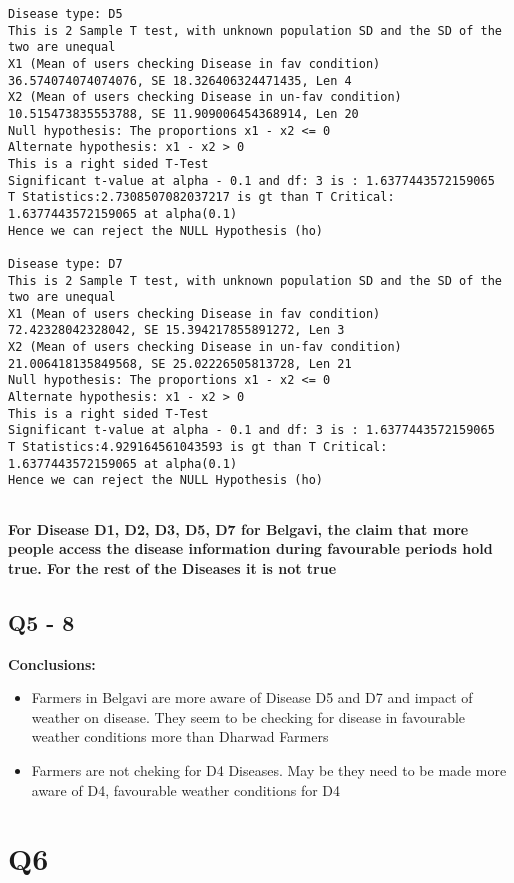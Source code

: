\documentclass[11pt]{article}
\providecommand{\tightlist}{%
      \setlength{\itemsep}{0pt}\setlength{\parskip}{0pt}}
\begin{document}
\begin{Verbatim}[commandchars=\\\{\}]
Disease type: D5
This is 2 Sample T test, with unknown population SD and the SD of the two are unequal
X1 (Mean of users checking Disease in fav condition) 36.574074074074076, SE 18.326406324471435, Len 4
X2 (Mean of users checking Disease in un-fav condition) 10.515473835553788, SE 11.909006454368914, Len 20
Null hypothesis: The proportions x1 - x2 <= 0
Alternate hypothesis: x1 - x2 > 0
This is a right sided T-Test
Significant t-value at alpha - 0.1 and df: 3 is : 1.6377443572159065
T Statistics:2.7308507082037217 is gt than T Critical: 1.6377443572159065 at alpha(0.1)
Hence we can reject the NULL Hypothesis (ho)

Disease type: D7
This is 2 Sample T test, with unknown population SD and the SD of the two are unequal
X1 (Mean of users checking Disease in fav condition) 72.42328042328042, SE 15.394217855891272, Len 3
X2 (Mean of users checking Disease in un-fav condition) 21.006418135849568, SE 25.02226505813728, Len 21
Null hypothesis: The proportions x1 - x2 <= 0
Alternate hypothesis: x1 - x2 > 0
This is a right sided T-Test
Significant t-value at alpha - 0.1 and df: 3 is : 1.6377443572159065
T Statistics:4.929164561043593 is gt than T Critical: 1.6377443572159065 at alpha(0.1)
Hence we can reject the NULL Hypothesis (ho)


    \end{Verbatim}

    \textbf{For Disease D1, D2, D3, D5, D7 for Belgavi, the claim that more
people access the disease information during favourable periods hold
true. For the rest of the Diseases it is not true}

    \subsection{Q5 - 8}\label{q5---8}

    \textbf{Conclusions:}

\begin{itemize}
\tightlist
\item
  Farmers in Belgavi are more aware of Disease D5 and D7 and impact of
  weather on disease. They seem to be checking for disease in favourable
  weather conditions more than Dharwad Farmers
\item
  Farmers are not cheking for D4 Diseases. May be they need to be made
  more aware of D4, favourable weather conditions for D4
\end{itemize}

    \section{Q6}\label{q6}
\end{document}
